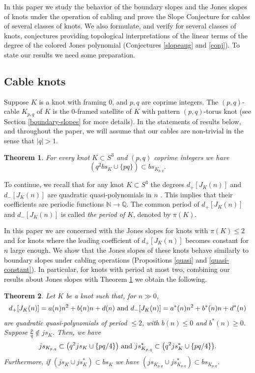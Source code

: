 \documentclass[11pt]{amsart}
\newtheorem{theorem}{Theorem}[section]
\theoremstyle{definition}
\newcommand{\K}{{K_{p, q}}}
\newcommand{\abs}[1]{{\left\vert #1 \right\vert}}
\def\BN{\mathbb N}
\def\BQ{\mathbb Q}
\begin{document}
In this paper we study the behavior of the  boundary slopes and the Jones slopes of knots under the operation of cabling and prove the Slope Conjecture for
  cables of
several classes of knots. We also formulate, and verify for several classes of knots,  conjectures providing  topological interpretations of the linear terms
of the degree of the colored Jones polynomial (Conjectures \ref{slopeaug} and \ref{conj}). To state our results we need some preparation.

\subsection{Cable knots}

Suppose $K$ is a knot with framing 0, and $p,q$ are coprime integers.
The $(p,q)$-cable $K_{p,q}$ of $K$ is the $0$-framed satellite of $K$ with
pattern $(p,q)$-torus knot (see Section \ref{boundary-slopes} for more details).
In the statements of results below, and throughout the paper,  we will assume that our cables are non-trivial in the  sense  that $\abs{q}>1$.


\begin{theorem} \label{bdry slope}
 For every knot $K \subset S^3$ and  $(p, q)$ coprime  integers
we have 
 $$\left( q^2 bs_K \cup \{pq\} \right) \subset bs_{K_{p,q}}.$$
\end{theorem}

To continue, we recall
that  for any knot $K\subset S^3$
the degrees $ d_+[J_{K}(n)] $ and $ d_-[J_{K}(n)] $ are quadratic quasi-polynomials in $n$  \cite{ga-quasi}. This implies that their coefficients are periodic functions $\BN \to \BQ$.
The common period  of $d_+[J_K(n)]$ and $d_-[J_K(n)]$ is called \emph{the period of $K$}, denoted  by $\pi(K)$. 

In this paper we are concerned with the Jones slopes 
for knots with $\pi(K)\leq 2$ and for knots where the leading coefficient  of $d_+[J_K(n)]$ becomes constant for $n$ large enough.
We show that the Jones slopes of these  knots behave similarly to  boundary slopes under cabling operations (Propositions \ref{quasi} and \ref{quasi-constant}).
In particular, for knots with period at most two, combining  our results about Jones slopes with Theorem \ref{bdry slope} we obtain the following.

\begin{theorem}
 \label{period2}
 Let $K$ be a knot such that, for $n \gg 0$,
$$
d_+[J_K(n)]=a(n)n^2+b(n)n+d(n) \  {\rm and } \  d_-[J_K(n)]=a^*(n)n^2+b^*(n)n+d^*(n)$$
are  quadratic quasi-polynomials of period $\le 2$, with $b(n) \le 0$ and $b^*(n) \ge 0$. Suppose $\frac{p}{q} \notin js_K$. 
Then, we have 
$$ js_{\K} \subset  \big( q^2js_{K} \cup \{pq/4\} \big) \ {\rm and} \  js^*_{\K} \subset  \big( q^2js^*_{K} \cup \{pq/4\} \big).$$
Furthermore, if $(js_K \cup js^*_K) \subset bs_K$ we have $(js_{\K} \cup js^*_{\K}) \subset bs_{\K}$.
 \end{theorem}
\end{document}
